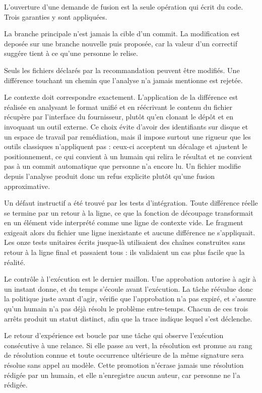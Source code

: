 \documentclass[12pt,a4paper,oneside]{report}
\begin{document}
L'ouverture d'une demande de fusion est la seule opération qui écrit du code.
Trois garanties y sont appliquées.

La branche principale n'est jamais la cible d'un commit. La modification est
deposée sur une branche nouvelle puis proposée, car la valeur d'un correctif
suggére tient à ce qu'une personne le relise.

Seuls les fichiers déclarés par la recommandation peuvent être modifiés. Une
différence touchant un chemin que l'analyse n'a jamais mentionne est rejetée.

Le contexte doit correspondre exactement. L'application de la différence est
réalisée en analysant le format unifié et en réécrivant le contenu du fichier
récupère par l'interface du fournisseur, plutôt qu'en clonant le dépôt et en
invoquant un outil externe. Ce choix évite d'avoir des identifiants sur disque et
un espace de travail par remédiation, mais il impose surtout une rigueur que les
outils classiques n'appliquent pas : ceux-ci acceptent un décalage et ajustent le
positionnement, ce qui convient à un humain qui relira le résultat et ne convient
pas à un commit automatique que personne n'a encore lu. Un fichier modifie depuis
l'analyse produit donc un refus explicite plutôt qu'une fusion approximative.

Un défaut instructif a été trouvé par les tests d'intégration. Toute différence
réelle se termine par un retour à la ligne, ce que la fonction de découpage
transformait en un élément vide interprété comme une ligne de contexte vide. Le
fragment exigeait alors du fichier une ligne inexistante et aucune différence ne
s'appliquait. Les onze tests unitaires écrits jusque-là utilisaient des chaînes
construites sans retour à la ligne final et passaient tous : ils validaient un cas
plus facile que la réalité.

Le contrôle à l'exécution est le dernier maillon. Une approbation autorise à agir
à un instant donne, et du temps s'écoule avant l'exécution. La tâche réévalue
donc la politique juste avant d'agir, vérifie que l'approbation n'a pas expiré,
et s'assure qu'un humain n'a pas déjà résolu le problème entre-temps. Chacun de
ces trois arrêts produit un statut distinct, afin que la trace indique lequel
s'est déclenche.

Le retour d'expérience est boucle par une tâche qui observe l'exécution
consécutive à une relance. Si elle passe au vert, la résolution est promue au
rang de résolution connue et toute occurrence ultérieure de la même signature
sera résolue sans appel au modèle. Cette promotion n'écrase jamais une résolution
rédigée par un humain, et elle n'enregistre aucun auteur, car personne ne l'a
rédigée.
\end{document}
